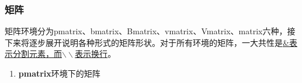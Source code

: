 \documentclass{article}
\begin{document}
			\subsubsection{矩阵}
				矩阵环境分为pmatrix、bmatrix、Bmatrix、vmatrix、Vmatrix、matrix六种，接下来将逐步展开说明各种形式的矩阵形状。对于所有环境的矩阵，一大共性是\underline{\&表示分割元素，而$\backslash\backslash$表示换行}。
				\begin{enumerate}
					\item \textbf{pmatrix}环境下的矩阵
					\begin{multicols}{2}
						\centering
					\end{multicols}
					

\end{enumerate}
\end{document}
